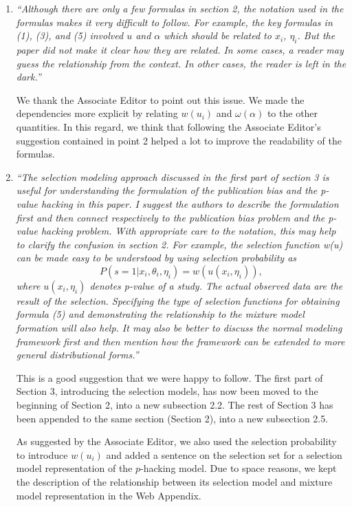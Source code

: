 \documentclass[11pt]{article}
\begin{document}
\begin{enumerate}

\item \emph{``Although there are only a few formulas in section 2, the notation used in the formulas makes it very difficult to follow. For example, the key formulas in (1), (3), and (5) involved $u$ and $\alpha$ which should be related to $x_i$, $\eta_i$. But the paper did not make it clear how they are related. In some cases, a reader may guess the relationship from the context. In other cases, the reader is left in the dark.''}


We thank the Associate Editor to point out this issue. We made the dependencies more explicit by relating $w(u_i)$ and $\omega(\alpha)$ to the other quantities. In this regard, we think that following the Associate Editor's suggestion contained in point 2 helped a lot to improve the readability of the formulas.



\item \emph{``The selection modeling approach discussed in the first part of section 3 is useful for understanding the formulation of the publication bias and the p-value hacking in this paper. I suggest the authors to describe the formulation first and then connect respectively to the publication bias problem and the p-value hacking problem. With appropriate care to the notation, this may help to clarify the confusion in section 2. For example, the selection function w(u) can be made easy to be understood by using selection probability as
$$
P(s = 1 | x_i, \theta_i, \eta_i) = w(u(x_i, \eta_i)),
$$
where $u(x_i, \eta_i)$ denotes p-value of a study. The actual observed data are the result of the selection. Specifying the type of selection functions for obtaining formula (5) and demonstrating the relationship to the mixture model formation will also help. It may also be better to discuss the normal modeling framework first and then mention how the framework can be extended to more general distributional forms.''}


This is a good suggestion that we were happy to follow. The first part of Section 3, introducing the selection models, has now been moved to the beginning of Section 2, into a new subsection 2.2. The rest of Section 3 has been appended to the same section (Section 2), into a new subsection 2.5.

As suggested by the Associate Editor, we also used the selection probability to introduce $w(u_i)$ and added a sentence on the selection set for a selection model representation of the $p$-hacking model. Due to space reasons, we kept the description of the relationship between its selection model and mixture model representation in the Web Appendix.




\end{enumerate}
\end{document}
